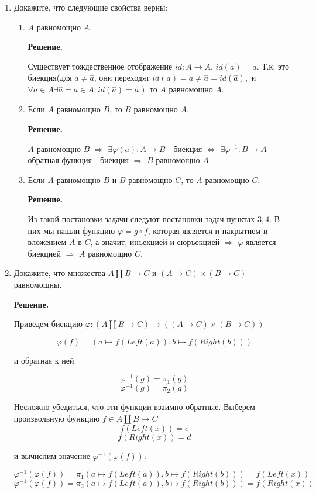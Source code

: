 \begin{enumerate}
\item Докажите, что следующие свойства верны:
\begin{enumerate}
\item $A$ равномощно $A$.

\textbf{Решение.} 

Существует тождественное отображение $id: A\rightarrow A$, $id(a) = a$. Т.к. это биекция(для 
$a\neq \hat{a}$, они переходят $id(a) = a \neq \hat{a} = id(\hat{a}),$ и $\forall a\in A 
\exists\hat{a} = a \in A : id(\hat{a}) = a$ ), то $A$ равномощно $A$. 

\item Если $A$ равномощно $B$, то $B$ равномощно $A$.

\textbf{Решение.} 

$A$ равномощно $B$ $\Rightarrow$ $\exists \varphi(a):A\rightarrow B$ - биекция 
$\Leftrightarrow$ $\exists \varphi^{-1} : B \rightarrow A$ - обратная функция - биекция 
$\Rightarrow$ $B$ равномощно $A$ 


\item Если $A$ равномощно $B$ и $B$ равномощно $C$, то $A$ равномощно $C$.

\textbf{Решение.} 

Из такой постановки задачи следуют постановки задач пунктах $3, 4$. В них мы нашли функцию 
$\varphi = g \circ f$, которая является и накрытием и вложением $A$ в $C$, а значит, инъекцией 
и сюръекцией $\Rightarrow$ $\varphi$ является биекцией $\Rightarrow$ $A$ равномощно $C$.

\end{enumerate}

\item Докажите, что множества $A \amalg B \to C$ и $(A \to C) \times (B \to C)$ равномощны.

\textbf{Решение.} 

Приведем биекцию $\varphi : (A \amalg B \to C) \rightarrow ((A \to C) \times (B \to C))$

$$\varphi(f) = (a \mapsto f(Left(a)), b \mapsto f(Right(b)))$$

и обратная к ней

$$\varphi^{-1}(g) = \pi_1(g)$$
$$\varphi^{-1}(g) = \pi_2(g)$$

Несложно убедиться, что эти функции взаимно обратные.
Выберем произвольную функцию $f\in A \amalg B \to C$
$$f(Left(x)) = e$$
$$f(Right(x)) = d$$

и вычислим значение $\varphi^{-1}(\varphi(f))$:

$$\varphi^{-1}(\varphi(f)) = \pi_1(a \mapsto f(Left(a)), b \mapsto f(Right(b))) = f(Left(x))$$
$$\varphi^{-1}(\varphi(f)) = \pi_2(a \mapsto f(Left(a)), b \mapsto f(Right(b))) = f(Right(x))$$


\end{enumerate}
